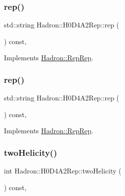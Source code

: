 \subsubsection{\texorpdfstring{rep()}{rep()}\hspace{0.1cm}{\footnotesize\ttfamily [2/3]}}
{\footnotesize\ttfamily std\+::string Hadron\+::\+H0\+D4\+A2\+Rep\+::rep (\begin{DoxyParamCaption}{ }\end{DoxyParamCaption}) const\hspace{0.3cm}{\ttfamily [inline]}, {\ttfamily [virtual]}}



Implements \mbox{\hyperlink{structHadron_1_1RepRep_ab3213025f6de249f7095892109575fde}{Hadron\+::\+Rep\+Rep}}.

\mbox{\label{structHadron_1_1H0D4A2Rep_ad23c66fe369200d0ff8bebcabf8dfc62}} 
\subsubsection{\texorpdfstring{rep()}{rep()}\hspace{0.1cm}{\footnotesize\ttfamily [3/3]}}
{\footnotesize\ttfamily std\+::string Hadron\+::\+H0\+D4\+A2\+Rep\+::rep (\begin{DoxyParamCaption}{ }\end{DoxyParamCaption}) const\hspace{0.3cm}{\ttfamily [inline]}, {\ttfamily [virtual]}}



Implements \mbox{\hyperlink{structHadron_1_1RepRep_ab3213025f6de249f7095892109575fde}{Hadron\+::\+Rep\+Rep}}.

\mbox{\label{structHadron_1_1H0D4A2Rep_a578e119705a5020872b1e872705ac47e}} 
\subsubsection{\texorpdfstring{twoHelicity()}{twoHelicity()}\hspace{0.1cm}{\footnotesize\ttfamily [1/2]}}
{\footnotesize\ttfamily int Hadron\+::\+H0\+D4\+A2\+Rep\+::two\+Helicity (\begin{DoxyParamCaption}{ }\end{DoxyParamCaption}) const\hspace{0.3cm}{\ttfamily [inline]}, {\ttfamily [virtual]}}

